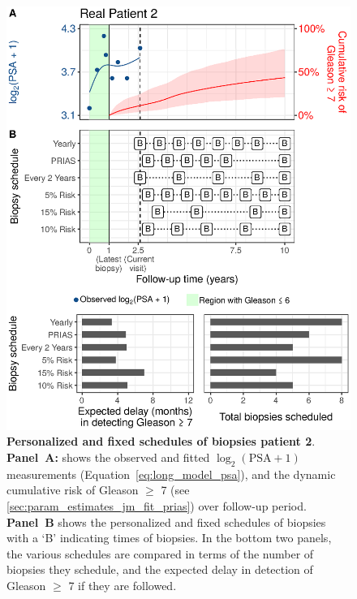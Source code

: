 \begin{figure}
\centerline{\includegraphics[width=\columnwidth]{images/demo_pat2_supp.eps}}
\caption{\textbf{Personalized and fixed schedules of biopsies patient 2}. \textbf{Panel~A:} shows the observed and fitted $\log_2(\mbox{PSA} + 1)$ measurements (Equation~\ref{eq:long_model_psa}), and the dynamic cumulative risk of Gleason $\geq$ 7 (see \ref{sec:param_estimates_jm_fit_prias}) over follow-up period. \textbf{Panel~B} shows the personalized and fixed schedules of biopsies with a `B' indicating times of biopsies. In the bottom two panels, the various schedules are compared in terms of the number of biopsies they schedule, and the expected delay in detection of Gleason $\geq$ 7 if they are followed.}
\label{fig:demo_pat2_supp}
\end{figure}


